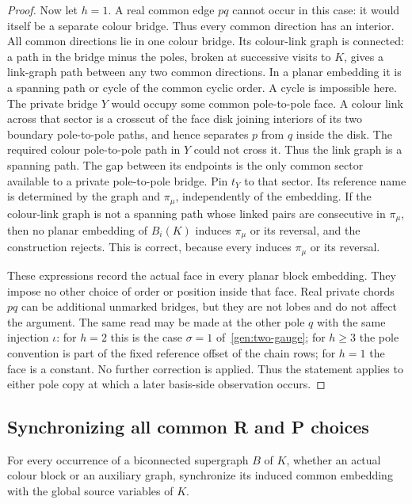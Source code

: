 \begin{proof}
Now let $h=1$.  A real common edge $pq$ cannot occur in this case:
it would itself be a separate colour bridge.  Thus every common direction
has an interior.  All common directions lie in one colour bridge.  Its
colour-link graph is connected: a path in the bridge minus the poles,
broken at successive visits to $K$, gives a link-graph path between any
two common directions.  In a planar embedding it is a spanning path or
cycle of the common cyclic order.  A cycle is impossible here.  The
private bridge $Y$ would occupy some common pole-to-pole face.  A colour
link across that sector is a crosscut of the face disk joining interiors
of its two boundary pole-to-pole paths, and hence separates $p$ from $q$
inside the disk.  The required colour pole-to-pole path in $Y$ could not
cross it.
Thus the link graph is a spanning path.  The gap between its endpoints is
the only common sector available to a private pole-to-pole bridge.  Pin
$t_Y$ to that sector.  Its reference name is determined by the graph and
$\pi_\mu$, independently of the embedding.  If the colour-link graph is not
a spanning path whose linked pairs are consecutive in $\pi_\mu$, then no
planar embedding of $B_i(K)$ induces $\pi_\mu$ or its reversal, and the
construction rejects.  This is correct, because every \SEFE{} induces
$\pi_\mu$ or its reversal.

These expressions record the actual face in every planar block embedding.
They impose no other choice of order or position inside that face.  Real
private chords $pq$ can be additional unmarked bridges, but they are not
lobes and do not affect the argument.  The same read may be made at the
other pole $q$ with the same injection $\iota$: for $h=2$ this is the
case $\sigma=1$ of~\eqref{gen:two-gauge}; for $h\geq3$ the pole
convention is part of the fixed reference offset of the chain rows; for
$h=1$ the face is a constant.  No further correction is applied.  Thus the
statement applies to either pole copy at which a later basis-side
observation occurs.
\end{proof}

\subsection{Synchronizing all common R and P choices}
\label{gen:sync}

For every occurrence of a biconnected supergraph $B$ of $K$, whether an
actual colour block or an auxiliary graph, synchronize its induced
common embedding with the global source variables of $K$.

